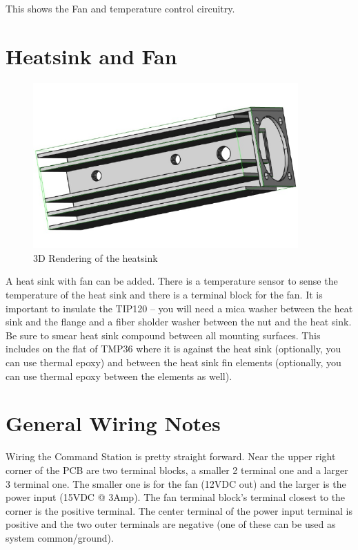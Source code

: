 This shows the Fan and temperature control circuitry.
\clearpage
\section{Heatsink and Fan}
\begin{figure}[hbpt]\begin{centering}%
\includegraphics[width=4in]{HeatSink3D.png}
\caption{3D Rendering of the heatsink}
\end{centering}\end{figure}

A heat sink with fan can be added. There is a temperature sensor to sense the
temperature of the heat sink and there is a terminal block for the fan. It is
important to insulate the TIP120 -- you will need a mica washer between the
heat sink and the flange and a fiber sholder washer between the nut and the
heat sink. Be sure to smear heat sink compound between all mounting surfaces.
This includes on the flat of TMP36 where it is against the heat sink
(optionally, you can use thermal epoxy) and between the heat sink fin elements
(optionally, you can use thermal epoxy between the elements as well).

\section{General Wiring Notes}

Wiring the Command Station is pretty straight forward. Near the upper right
corner of the PCB are two terminal blocks, a smaller 2 terminal one and a
larger 3 terminal one. The smaller one is for the fan (12VDC out) and the
larger is the power input (15VDC @ 3Amp).  The fan terminal block's terminal 
closest to the corner is the positive terminal.  The center terminal of the 
power input terminal is positive and the two outer terminals are negative (one 
of these can be used as system common/ground).

